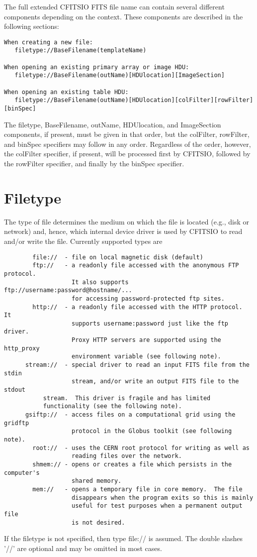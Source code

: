 \documentclass[11pt]{book}
\begin{document}
The full extended CFITSIO FITS file name can contain several different
components depending on the context.  These components are described in
the following sections:

\begin{verbatim}
When creating a new file:
   filetype://BaseFilename(templateName)

When opening an existing primary array or image HDU:
   filetype://BaseFilename(outName)[HDUlocation][ImageSection]

When opening an existing table HDU:
   filetype://BaseFilename(outName)[HDUlocation][colFilter][rowFilter][binSpec]
\end{verbatim}
The filetype, BaseFilename, outName, HDUlocation, and ImageSection
components, if present, must be given in that order, but the colFilter,
rowFilter, and binSpec specifiers may follow in any order.  Regardless
of the order, however, the colFilter specifier, if present, will be
processed first by CFITSIO, followed by the rowFilter specifier, and
finally by the binSpec specifier.


\section{Filetype}

The type of file determines the medium on which the file is located
(e.g., disk or network) and, hence, which internal device driver is used by
CFITSIO to read and/or write the file.  Currently supported types are

\begin{verbatim}
        file://  - file on local magnetic disk (default)
        ftp://   - a readonly file accessed with the anonymous FTP protocol.
                   It also supports  ftp://username:password@hostname/...
                   for accessing password-protected ftp sites.
        http://  - a readonly file accessed with the HTTP protocol.  It
                   supports username:password just like the ftp driver.
                   Proxy HTTP servers are supported using the http_proxy
                   environment variable (see following note).
      stream://  - special driver to read an input FITS file from the stdin
                   stream, and/or write an output FITS file to the stdout
		   stream.  This driver is fragile and has limited
		   functionality (see the following note).
      gsiftp://  - access files on a computational grid using the gridftp
                   protocol in the Globus toolkit (see following note).
        root://  - uses the CERN root protocol for writing as well as
                   reading files over the network.
        shmem:// - opens or creates a file which persists in the computer's
                   shared memory.
        mem://   - opens a temporary file in core memory.  The file
                   disappears when the program exits so this is mainly
                   useful for test purposes when a permanent output file
                   is not desired.
\end{verbatim}
If the filetype is not specified, then type file:// is assumed.
The double slashes '//' are optional and may be omitted in most cases.
\end{document}
